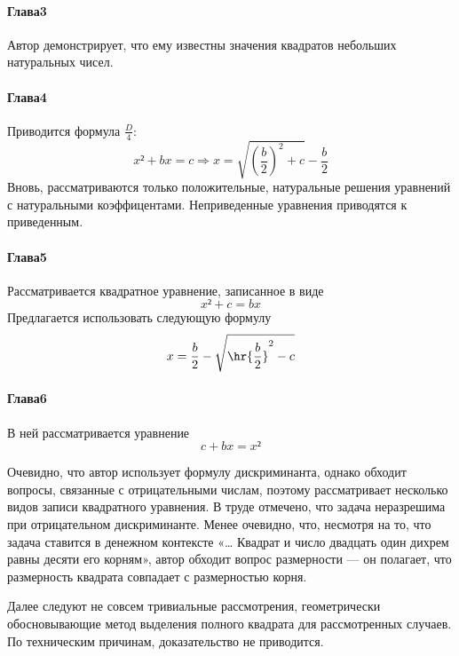 \documentclass[unicode, 10pt, a4paper, oneside, fleqn]{article}
\begin{document}
\paragraph{Глава3}
Автор демонстрирует, что ему известны значения квадратов небольших
натуральных чисел.
\paragraph{Глава4}
Приводится формула $\frac{D}{4}$:
\begin{displaymath}
  x²+bx = c ⇒ x = \sqrt{\left(\frac{b}{2}\right)^2 +c} - \frac{b}{2}
\end{displaymath}
Вновь, рассматриваются только положительные, натуральные решения уравнений с 
натуральными коэффицентами. Неприведенные уравнения приводятся к приведенным.
\paragraph{Глава5}
Рассматривается квадратное уравнение, записанное в виде
\begin{displaymath}
 x² + c = bx
\end{displaymath}
Предлагается использовать следующую формулу
\begin{displaymath}
  x = \frac{b}{2} - \sqrt{\hr{\frac{b}{2}}^2 - c}
\end{displaymath}
\paragraph{Глава6}
В ней рассматривается уравнение
\begin{displaymath}
  c + bx = x²
\end{displaymath}
\begin{note}
  Очевидно, что автор использует формулу дискриминанта, однако 
  обходит вопросы, связанные с отрицательными числам, поэтому 
  рассматривает несколько видов записи квадратного уравнения. В труде отмечено, 
  что задача неразрешима при отрицательном дискриминанте. Менее очевидно, 
  что, несмотря на то, что задача ставится в денежном контексте 
  «… Квадрат и число двадцать один дихрем равны десяти его корням», автор 
  обходит вопрос размерности — он полагает, что размерность квадрата совпадает
  с размерностью корня. 
\end{note}
\par 
Далее следуют не совсем тривиальные рассмотрения, геометрически обосновывающие
метод выделения полного квадрата для рассмотренных случаев. По техническим причинам,
доказательство не приводится.
\end{document}
